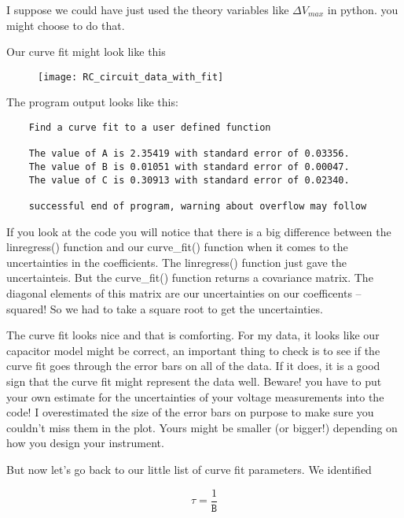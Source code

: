 I suppose we could have just used the theory variables like $\Delta V_{max}$ in python. you might choose to do that.

\vspace{1in}

Our curve fit might look like this

\begin{figure}[h!]
	\centering
	\texttt{[image: RC\_circuit\_data\_with\_fit]}
\end{figure}

\noindent The program output looks like this:

\begin{verbatim}
	Find a curve fit to a user defined function
	
	The value of A is 2.35419 with standard error of 0.03356.
	The value of B is 0.01051 with standard error of 0.00047.
	The value of C is 0.30913 with standard error of 0.02340.
	
	successful end of program, warning about overflow may follow
\end{verbatim}

If you look at the code you will notice that there is a big difference between the linregress() function and our curve\_fit() function when it comes to the uncertainties in the coefficients. The linregress() function just gave the uncertainteis. But the curve\_fit() function returns a covariance matrix. The diagonal elements of this matrix are our uncertainties on our coefficents -- squared! So we had to take a square root to get the uncertainties.

The curve fit looks nice and that is comforting. For my data, it looks like our capacitor model might be correct, an important thing to check is to see if the curve fit goes through the error bars on all of the data. If it does, it is a good sign that the curve fit might represent the data well.  Beware! you have to put your own estimate for the uncertainties of your voltage measurements into the code! I overestimated the size of the error bars on purpose to make sure you couldn't miss them in the plot. Yours might be smaller (or bigger!) depending on how you design your instrument.

But now let's go back to our little list of curve fit parameters. We identified 

\begin{equation*}
	\tau =\frac{1}{\mathtt{B}}
\end{equation*}


